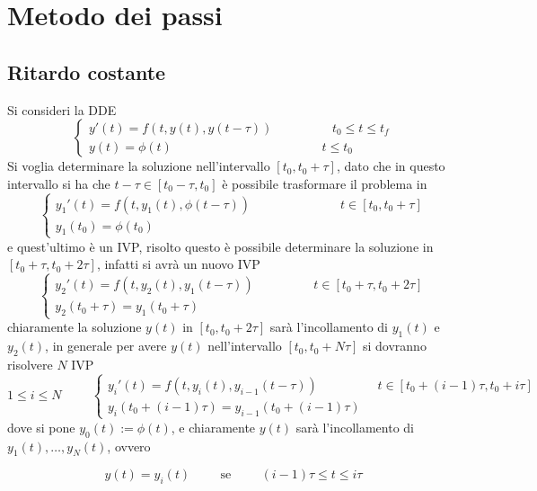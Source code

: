 \section{Metodo dei passi}
\subsection{Ritardo costante}
Si consideri la DDE
$$
\begin{cases}
 y'(t) = f(t,y(t),y(t- \tau))		\hspace{2cm}	t_0 \le t \le t_f \\
 y(t)=\phi(t)				\hspace{5cm}	t \le t_0
\end{cases}
$$
Si voglia determinare la soluzione nell'intervallo $[t_0,t_0+\tau]$, 
dato che in questo intervallo  
si ha che $t-\tau \in [t_0 - \tau, t_0]$ è possibile trasformare il problema in
$$
\begin{cases}
 y_1'(t) = f(t,y_1(t),\phi(t- \tau))		\hspace{3cm}	t \in [t_0 ,t_0+ \tau] \\
 y_1(t_0)=\phi(t_0)
\end{cases}
$$
e quest'ultimo è un IVP, risolto questo è possibile determinare la soluzione in 
$[t_0 + \tau, t_0 + 2 \tau]$, infatti si avrà un nuovo IVP
$$
\begin{cases}
 y_2'(t)=f(t,y_2(t),y_1(t-\tau)) 	 \hspace{2cm}			t \in [t_0+\tau,t_0 + 2\tau]	\\
 y_2(t_0+\tau)= y_1(t_0+\tau)
\end{cases}
$$ 
chiaramente la soluzione $y(t)$ in $[t_0,t_0+2\tau]$ sarà l'incollamento di $y_1(t)$ e $y_2(t)$, in generale 
per avere $y(t)$ nell'intervallo $[t_0,t_0 + N \tau]$ si dovranno risolvere $N$ IVP
$$
1 \le i \le N \hspace{1cm}
\begin{cases}
 y_i'(t)=f(t,y_i(t),y_{i-1}(t-\tau)) 	\hspace{1cm}  \hspace{1cm}		t \in [t_0+(i-1)\tau,t_0 + i\tau]	\\
 y_i(t_0+(i-1)\tau)= y_{i-1}(t_0+(i-1)\tau)
\end{cases}
$$
dove si pone $y_0(t):=\phi(t)$, e chiaramente $y(t)$ sarà l'incollamento di $y_1(t), \dots, y_N(t)$, ovvero

$$y(t)=y_i(t)	\hspace{1cm}	\mbox{se}	\hspace{1cm}	(i-1) \tau \le t \le i \tau$$

